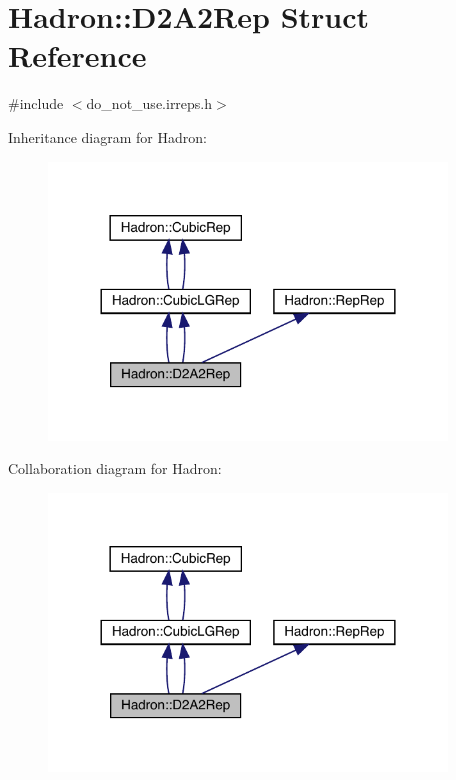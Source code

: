 \hypertarget{structHadron_1_1D2A2Rep}{}\section{Hadron\+:\+:D2\+A2\+Rep Struct Reference}
\label{structHadron_1_1D2A2Rep}


{\ttfamily \#include $<$do\+\_\+not\+\_\+use.\+irreps.\+h$>$}



Inheritance diagram for Hadron\+:\nopagebreak
\begin{figure}[H]
\begin{center}
\leavevmode
\includegraphics[width=300pt]{dd/d8b/structHadron_1_1D2A2Rep__inherit__graph}
\end{center}
\end{figure}


Collaboration diagram for Hadron\+:\nopagebreak
\begin{figure}[H]
\begin{center}
\leavevmode
\includegraphics[width=300pt]{dd/d35/structHadron_1_1D2A2Rep__coll__graph}
\end{center}
\end{figure}
